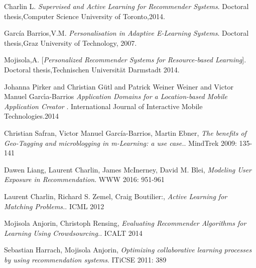 \documentclass[]{article}
\begin{document}
\renewcommand{\refname}{Referencias}
\begin{thebibliography}{9}
	
Charlin L. 
\textit{Supervised and Active Learning for Recommender Systems}. 
Doctoral thesis,Computer Science University of Toronto,2014.

García Barrios,V.M.
\textit{Personalisation in Adaptive E-Learning Systems}. 
Doctoral thesis,Graz University of Technology, 2007.

Mojisola,A.
[\textit{Personalized Recommender Systems for Resource-based Learning}]. 
Doctoral thesis,Technischen Universität Darmstadt 2014.

Johanna Pirker and
	Christian G{\"{u}}tl and
	Patrick Weiner Weiner and
	Victor Manuel Garc{\'{\i}}a{-}Barrios
\textit{Application Domains for a Location-based Mobile Application Creator
	}. 
 International Journal of Interactive Mobile Technologies.2014
 
Christian Safran, Victor Manuel García-Barrios, Martin Ebner, 
\textit{The benefits of Geo-Tagging and microblogging in m-Learning: a use case.}. 
MindTrek 2009: 135-141

  Dawen Liang, Laurent Charlin, James McInerney, David M. Blei, 
\textit{Modeling User Exposure in Recommendation}. 
WWW 2016: 951-961

 Laurent Charlin, Richard S. Zemel, Craig Boutilier:, 
\textit{Active Learning for Matching Problems.}. 
ICML 2012

 Mojisola Anjorin, Christoph Rensing,
\textit{Evaluating Recommender Algorithms for Learning Using Crowdsourcing.}. 
 ICALT 2014

Sebastian Harrach, Mojisola Anjorin,
\textit{Optimizing collaborative learning processes by using recommendation systems}. 
ITiCSE 2011: 389

\end{thebibliography}
\end{document}
